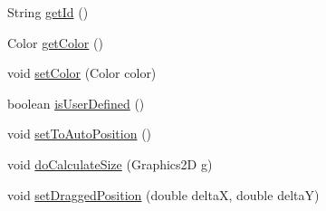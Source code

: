 \begin{DoxyCompactItemize}
\item 
String \hyperlink{classorg_1_1tzi_1_1use_1_1gui_1_1views_1_1diagrams_1_1elements_1_1_edge_property_a3a3ec445f9718e83f137dad83eae6b0e}{get\-Id} ()
\item 
Color \hyperlink{classorg_1_1tzi_1_1use_1_1gui_1_1views_1_1diagrams_1_1elements_1_1_edge_property_a6d80b5d7ad731df689a46aa5dd5eed88}{get\-Color} ()
\item 
void \hyperlink{classorg_1_1tzi_1_1use_1_1gui_1_1views_1_1diagrams_1_1elements_1_1_edge_property_a8995a4f020deb6d869dee16295cd9a6f}{set\-Color} (Color color)
\item 
boolean \hyperlink{classorg_1_1tzi_1_1use_1_1gui_1_1views_1_1diagrams_1_1elements_1_1_edge_property_af4649a6af3c34a27c8679eb7a7f60814}{is\-User\-Defined} ()
\item 
void \hyperlink{classorg_1_1tzi_1_1use_1_1gui_1_1views_1_1diagrams_1_1elements_1_1_edge_property_addf29e6c3ca78583afbf35d1ec72a96f}{set\-To\-Auto\-Position} ()
\item 
void \hyperlink{classorg_1_1tzi_1_1use_1_1gui_1_1views_1_1diagrams_1_1elements_1_1_edge_property_ad5612620be27fe4729e1e1c94c83b7e9}{do\-Calculate\-Size} (Graphics2\-D g)
\item 
void \hyperlink{classorg_1_1tzi_1_1use_1_1gui_1_1views_1_1diagrams_1_1elements_1_1_edge_property_aede82cd94e2f8a550e684a98869a2736}{set\-Dragged\-Position} (double delta\-X, double delta\-Y)
\end{DoxyCompactItemize}
